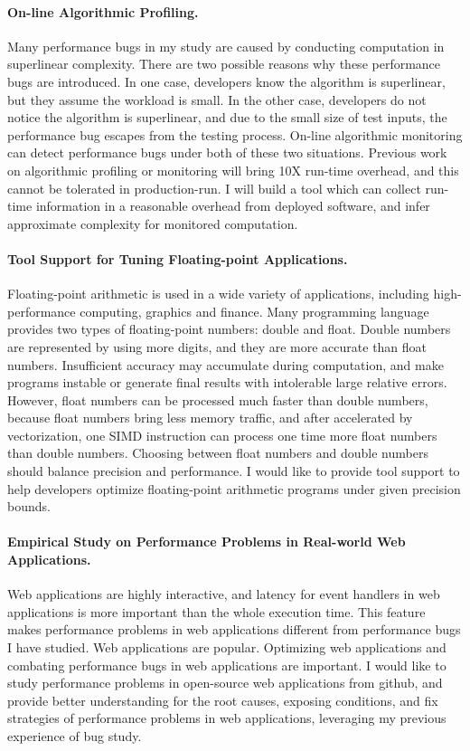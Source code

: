 \documentclass[10pt]{article}
\begin{document}
\paragraph{On-line Algorithmic Profiling.}
Many performance bugs in my study are caused by conducting computation in superlinear complexity. 
There are two possible reasons why these performance bugs are introduced. 
In one case, developers know the algorithm is superlinear, but they assume the workload is small. 
In the other case, developers do not notice the algorithm is superlinear, 
and due to the small size of test inputs, 
the performance bug escapes from the testing process. 
On-line algorithmic monitoring can detect performance bugs under both of these two situations. 
Previous work on algorithmic profiling or monitoring will bring 10X run-time overhead, 
and this cannot be tolerated in production-run. 
I will build a tool which can collect run-time information in a reasonable overhead from deployed software, 
and infer approximate complexity for monitored computation. 


\paragraph{Tool Support for Tuning Floating-point Applications.}
Floating-point arithmetic is used in a wide variety of applications, 
including high-performance computing, graphics and finance. 
Many programming language provides two types of floating-point numbers: double and float. 
Double numbers are represented by using more digits, and they are more accurate than float numbers. 
Insufficient accuracy may accumulate during computation, 
and make programs instable or generate final results with intolerable large relative errors. 
However, float numbers can be processed much faster than double numbers, 
because float numbers bring less memory traffic, 
and after accelerated by vectorization, one SIMD instruction can process one time more float numbers than double numbers. 
Choosing between float numbers and double numbers should balance precision and performance. 
I would like to provide tool support to help developers optimize floating-point arithmetic programs under given precision bounds. 

\paragraph{Empirical Study on  Performance Problems in Real-world Web Applications.}
Web applications are highly interactive, 
and latency for event handlers in web applications is more important than the whole execution time. 
This feature makes performance problems in web applications different from performance bugs I have studied. 
Web applications are popular. 
Optimizing web applications and combating performance bugs in web applications are important. 
I would like to study performance problems in open-source web applications from github, 
and provide better understanding for the root causes, 
exposing conditions, and fix strategies of performance problems in web applications, 
leveraging my previous experience of bug study. 







\newpage


\end{document}
